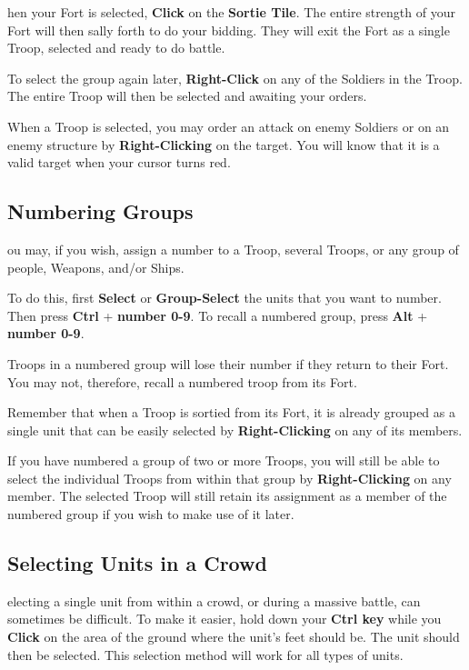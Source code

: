 hen your Fort is selected, \textbf{Click} on the \textbf{Sortie Tile}. The entire strength of your Fort will then sally forth to do your bidding. They will exit the Fort as a single Troop, selected and ready to do battle.

To select the group again later, \textbf{Right-Click} on any of the Soldiers in the Troop. The entire Troop will then be selected and awaiting your orders.

When a Troop is selected, you may order an attack on enemy Soldiers or on an enemy structure by \textbf{Right-Clicking} on the target. You will know that it is a valid target when your cursor turns red.

\subsection{\textsf{Numbering Groups}}


ou may, if you wish, assign a number to a Troop, several Troops, or any group of people, Weapons, and/or Ships.

To do this, first \textbf{Select} or \textbf{Group-Select} the units that you want to number. Then press \textbf{Ctrl} + \textbf{number 0-9}. To recall a numbered group, press \textbf{Alt} + \textbf{number 0-9}.

Troops in a numbered group will lose their number if they return to their Fort. You may not, therefore, recall a numbered troop from its Fort.

Remember that when a Troop is sortied from its Fort, it is already grouped as a single unit that can be easily selected by \textbf{Right-Clicking} on any of its members.

If you have numbered a group of two or more Troops, you will still be able to select the individual Troops from within that group by \textbf{Right-Clicking} on any member. The selected Troop will still retain its assignment as a member of the numbered group if you wish to make use of it later.

\subsection{\textsf{Selecting Units in a Crowd}}


electing a single unit from within a crowd, or during a massive battle, can sometimes be difficult. To make it easier, hold down your \textbf{Ctrl key} while you \textbf{Click} on the area of the ground where the unit’s feet should be. The unit should then be selected. This selection method will work for all types of units.

